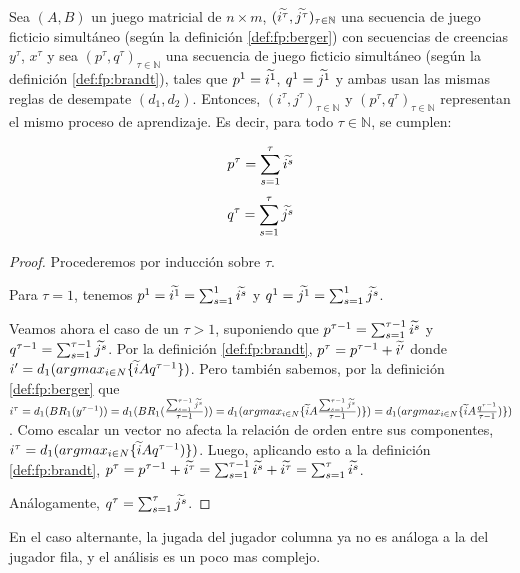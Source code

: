 \begin{lemma} \label{lema:equiv:sim}
    Sea $(A, B)$ un juego matricial de $n \times m$, $(\widetilde{i^\tau}, \widetilde{j^\tau})_{\tau \in \mathbb{N}}$ una secuencia de juego ficticio simultáneo (según la definición \ref{def:fp:berger}) con secuencias de creencias $y^\tau$, $x^\tau$ y sea $(p^\tau, q^\tau)_{\tau \in \mathbb{N}}$ una secuencia de juego ficticio simultáneo (según la definición \ref{def:fp:brandt}), tales que $p^1 = \widetilde{i^1}$, $q^1 = \widetilde{j^1}$ y ambas usan las mismas reglas de desempate $(d_1, d_2)$. Entonces, $(i^\tau, j^\tau)_{\tau \in \mathbb{N}}$ y $(p^\tau, q^\tau)_{\tau \in \mathbb{N}}$ representan el mismo proceso de aprendizaje. Es decir, para todo $\tau \in \mathbb{N}$, se cumplen:

    \[ p^{\tau} = \sum_{s=1}^\tau{\widetilde{i^s}} \]
    \[ q^{\tau} = \sum_{s=1}^\tau{\widetilde{j^s}} \]

\end{lemma}
\begin{proof}
    Procederemos por inducción sobre $\tau$.

    Para $\tau = 1$, tenemos $p^1 = \widetilde{i^1} = \sum_{s=1}^1{\widetilde{i^s}}$ y $q^1 = \widetilde{j^1} = \sum_{s=1}^1{\widetilde{j^s}}$.

    Veamos ahora el caso de un $\tau > 1$, suponiendo que $p^{\tau-1} = \sum_{s=1}^{\tau-1}{\widetilde{i^s}}$ y $q^{\tau-1} = \sum_{s=1}^{\tau-1}{\widetilde{j^s}}$.
    Por la definición \ref{def:fp:brandt}, $p^\tau = p^{\tau-1} + \widetilde{i'}$ donde $i' = d_1(argmax_{i \in N}\{\widetilde{i}Aq^{\tau-1}\})$.
    Pero también sabemos, por la definición \ref{def:fp:berger}
    que $i^\tau = d_1(BR_1(y^{\tau-1})) = d_1(BR_1(\frac{\sum_{s=1}^{\tau-1} \widetilde{j^s}}{\tau-1})) = d_1(argmax_{i \in N}\{\widetilde{i} A\frac{\sum_{s=1}^{\tau-1} \widetilde{j^s}}{\tau-1})\}) = d_1(argmax_{i \in N}\{\widetilde{i} A\frac{q^{\tau-1}}{\tau-1})\})$.
    Como escalar un vector no afecta la relación de orden entre sus componentes, $i^\tau = d_1(argmax_{i \in N}\{\widetilde{i} Aq^{\tau-1})\})$.
    Luego, aplicando esto a la definición \ref{def:fp:brandt}, $p^\tau = p^{\tau-1} + \widetilde{i^\tau} = \sum_{s=1}^{\tau-1}{\widetilde{i^s}} + \widetilde{i^\tau} = \sum_{s=1}^{\tau}{\widetilde{i^s}}$.
    
    Análogamente, $q^{\tau} = \sum_{s=1}^\tau{\widetilde{j^s}}$.
\end{proof}


En el caso alternante, la jugada del jugador columna ya no es análoga a la del jugador fila, y el análisis es un poco mas complejo.


